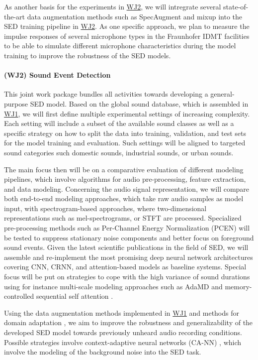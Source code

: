 \documentclass[11pt]{article}
\newcommand{\wpdef}[2]{\hypertarget{sec:W#1}{\paragraph*{(W#1) #2}\label{sec:W#1}}}
\newcommand{\wpref}[2]{\hyperlink{sec:W#1}{#2}}
\begin{document}
As another basis for the experiments in \wpref{J2}{WJ2}, we will intregrate several state-of-the-art data augmentation methods such as SpecAugment and mixup into the SED training pipeline in \wpref{J2}{WJ2}. As one specific approach, we plan to measure the impulse responses of several microphone types in the Fraunhofer IDMT facilities to be able to simulate different microphone characteristics during the model training to improve the robustness of the SED models.


\wpdef{J2}{Sound Event Detection}

This joint work package bundles all activities towards developing a general-purpose SED model.
Based on the global sound database, which is assembled in \wpref{J1}{WJ1}, we will first define multiple experimental settings of increasing complexity. Each setting will include a subset of the available sound classes as well as a specific strategy on how to split the data into training, validation, and test sets for the model training and evaluation. Such settings will be aligned to targeted sound categories such domestic sounds, industrial sounds, or urban sounds. 

The main focus then will be on a comparative evaluation of different modeling pipelines, which involve algorithms for audio pre-processing, feature extraction, and data modeling.
Concerning the audio signal representation, we will compare both end-to-end modeling approaches, which take raw audio samples as model input, with spectrogram-based approaches, where two-dimensional representations such as mel-spectrograms, or STFT are processed. Specialized pre-processing methods such as Per-Channel Energy Normalization (PCEN) \cite{Lostanlen:2018:PCEN:SPL} will be tested to suppress stationary noise components and better focus on foreground sound events.
Given the latest scientific publications in the field of SED, we will assemble and re-implement the most promising deep neural network architectures covering CNN, CRNN, and attention-based models \cite{Zhang:2020:FrameLevelAttention:ARXIV} as baseline systems.
Special focus will be put on strategies to cope with the high variance of sound durations
using for instance multi-scale modeling approaches such as AdaMD \cite{Ding:2020:AdaMD:IEEE_TASLP} and memory-controlled sequential self attention \cite{Pankajakshan:2020:MSSSelfAttention:ARXIV}. 

Using the data augmentation methods implemented in \wpref{J1}{WJ1} and methods for domain adaptation \cite{Drossos:2019:DomainAdaptation:WASPAA}, we aim to improve the robustness and generalizability of the developed SED model towards previously unheard audio recording conditions. Possible strategies involve context-adaptive neural networks (CA-NN) \cite{Lostanlen:2019:EventDetection:PLOS}, which involve the modeling of the background noise into the SED task.
\end{document}
